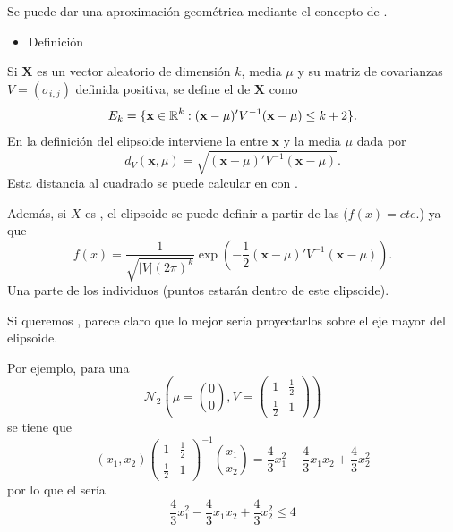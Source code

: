 Se puede dar una aproximación geométrica mediante el concepto de .
\begin{itemize}[label=\color{red}\textbullet, leftmargin=*]
	\item \color{lightblue}Definición
\end{itemize}
Si $\mathbf{X}$ es un vector aleatorio de dimensión $k$, media $\mu$ y su matriz de covarianzas $V=(\sigma_{i,j})$ definida positiva, se define el  de $\mathbf{X}$ como \[ E_k=\{\mathbf{x}\in\operatorname{\mathbb{R}}^k:(\mathbf{x}-\mu)'V^{-1}(\mathbf{x}-\mu)\le k+2\}. \]
En la definición del elipsoide interviene la  entre $\mathbf{x}$ y la media $\mu$ dada por \[ d_V(\mathbf{x},\mu)=\sqrt{(\mathbf{x}-\mu)'V^{-1}(\mathbf{x}-\mu)}. \]
Esta distancia al cuadrado se puede calcular en  con .

Además, si $X$ es , el elipsoide se puede definir a partir de las  ($f(x)=cte$.) ya que \[ f(x)=\dfrac{1}{\sqrt{|V|(2\pi)^k}}\exp\left(-\dfrac{1}{2}(\mathbf{x}-\mu)'V^{-1}(\mathbf{x}-\mu)\right). \]
Una parte de los individuos (puntos estarán dentro de este elipsoide).

Si queremos , parece claro que lo mejor sería proyectarlos sobre el eje mayor del elipsoide.

Por ejemplo, para una  \[ \mathcal{N}_2\left(\mu=\binom{0}{0},V=\begin{pmatrix}
	1 & \tfrac{1}{2}\\
	\tfrac{1}{2} & 1
\end{pmatrix}\right) \] se tiene que \[ (x_1,x_2)\begin{pmatrix}
1 & \tfrac{1}{2}\\
\tfrac{1}{2} & 1
\end{pmatrix}^{-1}\binom{x_1}{x_2}=\dfrac{4}{3}x_1^2-\dfrac{4}{3}x_1x_2+\dfrac{4}{3}x_2^2 \] por lo que el  sería \[ \dfrac{4}{3}x_1^2-\dfrac{4}{3}x_1x_2+\dfrac{4}{3}x_2^2\le4 \]

